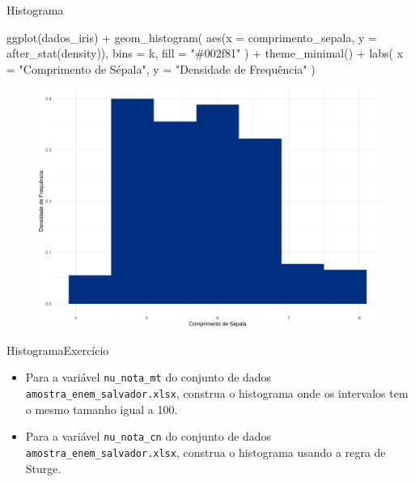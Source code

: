 \documentclass[
  10pt,
  ignorenonframetext,
]{beamer}
\newenvironment{Shaded}{\begin{snugshade}}{\end{snugshade}}
\newcommand{\AttributeTok}[1]{\textcolor[rgb]{0.40,0.45,0.13}{#1}}
\newcommand{\FunctionTok}[1]{\textcolor[rgb]{0.28,0.35,0.67}{#1}}
\newcommand{\NormalTok}[1]{\textcolor[rgb]{0.00,0.23,0.31}{#1}}
\newcommand{\SpecialCharTok}[1]{\textcolor[rgb]{0.37,0.37,0.37}{#1}}
\newcommand{\StringTok}[1]{\textcolor[rgb]{0.13,0.47,0.30}{#1}}
\providecommand{\tightlist}{%
  \setlength{\itemsep}{0pt}\setlength{\parskip}{0pt}}\usepackage{longtable,booktabs,array}
\begin{document}
\begin{frame}[fragile]{Histograma}
\protect\hypertarget{histograma-2}{}
\begin{Shaded}
\begin{Highlighting}[]
\FunctionTok{ggplot}\NormalTok{(dados\_iris) }\SpecialCharTok{+}
  \FunctionTok{geom\_histogram}\NormalTok{(}
    \FunctionTok{aes}\NormalTok{(}\AttributeTok{x =}\NormalTok{ comprimento\_sepala, }\AttributeTok{y =} \FunctionTok{after\_stat}\NormalTok{(density)),}
    \AttributeTok{bins =}\NormalTok{ k,}
    \AttributeTok{fill =} \StringTok{"\#002f81"}
\NormalTok{  ) }\SpecialCharTok{+}
  \FunctionTok{theme\_minimal}\NormalTok{() }\SpecialCharTok{+}
  \FunctionTok{labs}\NormalTok{(}
    \AttributeTok{x =} \StringTok{"Comprimento de Sépala"}\NormalTok{,}
    \AttributeTok{y =} \StringTok{"Densidade de Frequência"}
\NormalTok{  )}
\end{Highlighting}
\end{Shaded}
\end{frame}

\begin{frame}
\begin{figure}

{\centering \includegraphics[width=1\textwidth,height=\textheight]{exploracao-visualizacao_files/figure-beamer/unnamed-chunk-71-1.pdf}

}

\end{figure}
\end{frame}

\begin{frame}[fragile]{Histograma\newline Exercício}
\protect\hypertarget{histogramaexercuxedcio}{}
\begin{itemize}
\tightlist
\item
  Para a variável \texttt{nu\_nota\_mt} do conjunto de dados
  \texttt{amostra\_enem\_salvador.xlsx}, construa o histograma onde os
  intervalos tem o mesmo tamanho igual a 100.
\item
  Para a variável \texttt{nu\_nota\_cn} do conjunto de dados
  \texttt{amostra\_enem\_salvador.xlsx}, construa o histograma usando a
  regra de Sturge.
\end{itemize}
\end{frame}
\end{document}
